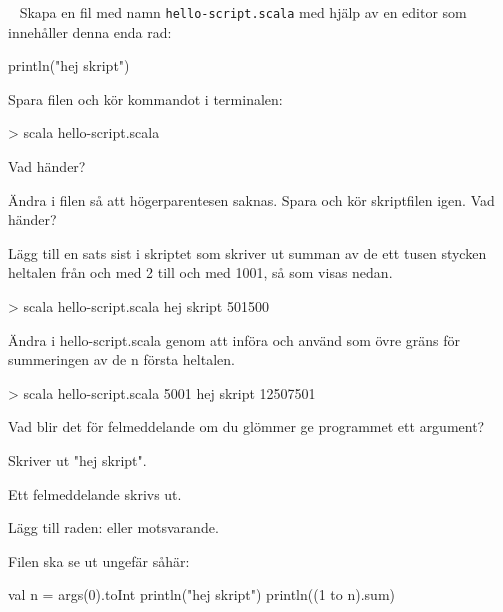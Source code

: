 \QUESTEND









\QUESTBEGIN

\Task  \what~  Skapa en fil med namn \texttt{hello-script.scala} med hjälp av en editor som innehåller denna enda rad:
\begin{Code}
println("hej skript")
\end{Code}
Spara filen och kör kommandot  i terminalen:
\begin{REPLnonum}
> scala hello-script.scala
\end{REPLnonum}

\Subtask Vad händer?

\Subtask Ändra i filen så att högerparentesen saknas. Spara och kör skriptfilen igen. Vad händer?

\Subtask Lägg till en sats sist i skriptet som skriver ut summan av de ett tusen stycken heltalen från och med 2 till och med 1001, så som visas nedan.
\begin{REPL}
> scala hello-script.scala
hej skript
501500
\end{REPL}

\Subtask Ändra i hello-script.scala genom att införa  och använd  som övre gräns för summeringen av de n första heltalen.
\begin{REPL}
> scala hello-script.scala 5001
hej skript
12507501
\end{REPL}

\Subtask Vad blir det för felmeddelande om du glömmer ge programmet ett argument?


\SOLUTION


\TaskSolved \what
 

\SubtaskSolved  Skriver ut "hej skript".

\SubtaskSolved  Ett felmeddelande skrivs ut.

\SubtaskSolved  Lägg till raden:
eller motsvarande.

\SubtaskSolved  Filen ska se ut ungefär såhär: \\
\begin{Code} 
val n = args(0).toInt 
println("hej skript") 
println((1 to n).sum)
\end{Code}

\SubtaskSolved  {}



